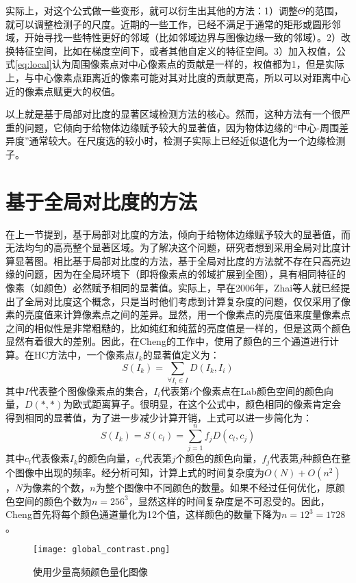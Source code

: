 实际上，对这个公式做一些变形，就可以衍生出其他的方法：1）调整$\Theta$的范围，就可以调整检测子的尺度。近期的一些工作，已经不满足于通常的矩形或圆形邻域，开始寻找一些特性更好的邻域（比如邻域边界与图像边缘一致的邻域）。2）改换特征空间，比如在梯度空间下，或者其他自定义的特征空间。3）加入权值，公式\ref{eq:local}认为周围像素点对中心像素点的贡献是一样的，权值都为1，但是实际上，与中心像素点距离近的像素可能对其对比度的贡献更高，所以可以对距离中心近的像素点赋更大的权值。

以上就是基于局部对比度的显著区域检测方法的核心。然而，这种方法有一个很严重的问题，它倾向于给物体边缘赋予较大的显著值，因为物体边缘的“中心-周围差异度”通常较大。在尺度选的较小时，检测子实际上已经近似退化为一个边缘检测子。

\section{基于全局对比度的方法}
在上一节提到，基于局部对比度的方法，倾向于给物体边缘赋予较大的显著值，而无法均匀的高亮整个显著区域。为了解决这个问题，研究者想到采用全局对比度计算显著图。相比基于局部对比度的方法，基于全局对比度的方法就不存在只高亮边缘的问题，因为在全局环境下（即将像素点的邻域扩展到全图），具有相同特征的像素（如颜色）必然赋予相同的显著值。实际上，早在2006年，Zhai\cite{zhai2006visual}等人就已经提出了全局对比度这个概念，只是当时他们考虑到计算复杂度的问题，仅仅采用了像素的亮度值来计算像素点之间的差异。显然，用一个像素点的亮度值来度量像素点之间的相似性是非常粗糙的，比如纯红和纯蓝的亮度值是一样的，但是这两个颜色显然有着很大的差别。因此，在Cheng的工作中\cite{cheng2011global}，使用了颜色的三个通道进行计算。在HC方法中，一个像素点$I_k$的显著值定义为：
\begin{equation}
S(I_k)=\sum_{\forall I_i \in I}D(I_k,I_i)
\end{equation}
其中$I$代表整个图像像素点的集合，$I_i$代表第$i$个像素点在Lab颜色空间的颜色向量，$D(*,*)$为欧式距离算子。很明显，在这个公式中，颜色相同的像素肯定会得到相同的显著值，为了进一步减少计算开销，上式可以进一步简化为：
\begin{equation}
S(I_k)=S(c_l)=\sum_{j=1}^n f_j D(c_l,c_j)
\end{equation}
其中$c_l$代表像素$I_k$的颜色向量，$c_j$代表第$j$个颜色的颜色向量，$f_j$代表第$j$种颜色在整个图像中出现的频率。经分析可知，计算上式的时间复杂度为$O(N)+O(n^2)$，$N$为像素的个数，$n$为整个图像中不同颜色的数量。如果不经过任何优化，原颜色空间的颜色个数为$n=256^3$，显然这样的时间复杂度是不可忍受的。因此，Cheng首先将每个颜色通道量化为12个值，这样颜色的数量下降为$n=12^3=1728$。
\begin{figure}
\centering
\texttt{[image: global\_contrast.png]}
\caption{使用少量高频颜色量化图像}\label{fig:global_contrast}
\end{figure}
